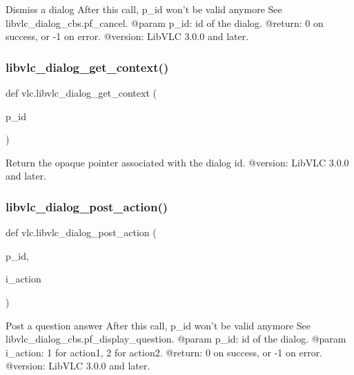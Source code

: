 \begin{DoxyVerb}Dismiss a dialog
After this call, p_id won't be valid anymore
See libvlc_dialog_cbs.pf_cancel.
@param p_id: id of the dialog.
@return: 0 on success, or -1 on error.
@version: LibVLC 3.0.0 and later.
\end{DoxyVerb}
 \mbox{\label{namespacevlc_a5ea0badeed0f8c755ec3c2ba8d575120}} 
\subsubsection{\texorpdfstring{libvlc\+\_\+dialog\+\_\+get\+\_\+context()}{libvlc\_dialog\_get\_context()}}
{\footnotesize\ttfamily def vlc.\+libvlc\+\_\+dialog\+\_\+get\+\_\+context (\begin{DoxyParamCaption}\item[{}]{p\+\_\+id }\end{DoxyParamCaption})}

\begin{DoxyVerb}Return the opaque pointer associated with the dialog id.
@version: LibVLC 3.0.0 and later.
\end{DoxyVerb}
 \mbox{\label{namespacevlc_ae828437593ff045f13c2befbe418d3f4}} 
\subsubsection{\texorpdfstring{libvlc\+\_\+dialog\+\_\+post\+\_\+action()}{libvlc\_dialog\_post\_action()}}
{\footnotesize\ttfamily def vlc.\+libvlc\+\_\+dialog\+\_\+post\+\_\+action (\begin{DoxyParamCaption}\item[{}]{p\+\_\+id,  }\item[{}]{i\+\_\+action }\end{DoxyParamCaption})}

\begin{DoxyVerb}Post a question answer
After this call, p_id won't be valid anymore
See libvlc_dialog_cbs.pf_display_question.
@param p_id: id of the dialog.
@param i_action: 1 for action1, 2 for action2.
@return: 0 on success, or -1 on error.
@version: LibVLC 3.0.0 and later.
\end{DoxyVerb}
 \mbox{\label{namespacevlc_a91274ca62987d6dc96fab02187a0ab11}} 
